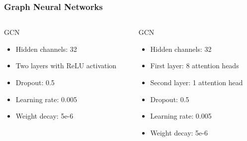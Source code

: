 \documentclass[10pt, aspectratio = 169]{beamer}
\begin{document}
\begin{frame}
\begin{columns}[t]
\begin{column}{0.4\textwidth}
\begin{figure}
            \end{figure}
        \end{column}
    \end{columns}


\end{frame}

\begin{frame}
    \frametitle{Graph Neural Networks}
    \begin{columns}[t]
        \begin{column}{0.5\textwidth}
            \begin{block}{GCN}
                \begin{itemize}
                    \item Hidden channels: 32
                    \item Two layers with ReLU activation
                    \item Dropout: 0.5
                    \item Learning rate: 0.005
                    \item Weight decay: 5e-6
                \end{itemize}
            \end{block}
        \end{column}
        \begin{column}{0.5\textwidth}
            \begin{block}{GCN}
                \begin{itemize}
                    \item Hidden channels: 32
                    \item First layer: 8 attention heads
                    \item Second layer: 1 attention head
                    \item Dropout: 0.5
                    \item Learning rate: 0.005
                    \item Weight decay: 5e-6
                \end{itemize}
            \end{block}
        \end{column}
    \end{columns}
\end{frame}
\end{document}
